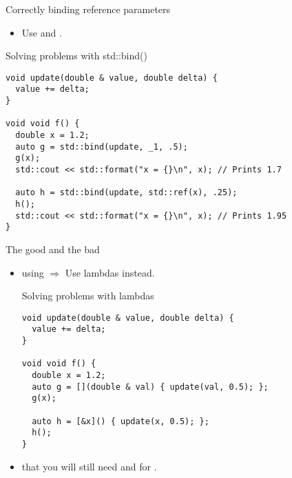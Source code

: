 \begin{frame}[t,fragile]{Correctly binding reference parameters}
\begin{itemize}
  \item Use  and .
\end{itemize}

\begin{block}{Solving problems with std::bind()}
\begin{lstlisting}[basicstyle=\tiny]
void update(double & value, double delta) {
  value += delta;
}

void void f() {
  double x = 1.2; 
  auto g = std::bind(update, _1, .5);
  g(x);
  std::cout << std::format("x = {}\n", x); // Prints 1.7

  auto h = std::bind(update, std::ref(x), .25);
  h();
  std::cout << std::format("x = {}\n", x); // Prints 1.95
}
\end{lstlisting}
\end{block}
\end{frame}

\begin{frame}[t,fragile]{The good and the bad}
\begin{itemize}
  \item {} using  $\Rightarrow$ Use lambdas instead.
\begin{block}{Solving problems with lambdas}
\begin{lstlisting}[basicstyle=\tiny]
void update(double & value, double delta) {
  value += delta;
}

void void f() {
  double x = 1.2; 
  auto g = [](double & val) { update(val, 0.5); };
  g(x);

  auto h = [&x]() { update(x, 0.5); };
  h();
}
\end{lstlisting}
\end{block}

  \pause
  \item {} that you will still need  and 
        for .

\end{itemize}
\end{frame}
